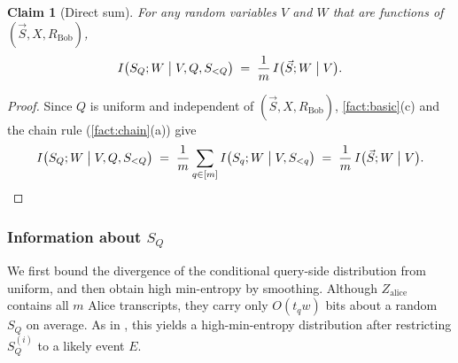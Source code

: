 \documentclass[11pt]{article}
\theoremstyle{plain}
\newtheorem{claim}[theorem]{Claim}
\theoremstyle{definition}
\theoremstyle{remark}
\newcommand{\vS}{\vec{S}}
\begin{document}
\begin{claim}[Direct sum]\label{clm:direct-sum}
For any random variables $V$ and $W$ that are functions of $(\vS, X, R_{\mathrm{Bob}})$,
\[ I\big(S_Q; W \bigm| V, Q, S_{<Q}\big) \;=\; \frac1m\, I\big(\vS; W \bigm| V\big). \]
\end{claim}
\begin{proof}
Since $Q$ is uniform and independent of $(\vS, X, R_{\mathrm{Bob}})$, \cref{fact:basic}(c) and the chain rule (\cref{fact:chain}(a)) give
\[ I\big(S_Q; W \bigm| V, Q, S_{<Q}\big) \;=\; \frac1m \sum_{q \in [m]} I\big(S_q; W \bigm| V, S_{<q}\big) \;=\; \frac1m\, I\big(\vS; W \bigm| V\big). \qedhere \]
\end{proof}

\subsubsection{Information about \texorpdfstring{$S_Q$}{S\_Q}}

We first bound the divergence of the conditional query-side distribution from uniform, and then obtain high min-entropy by smoothing. Although $Z_{\mathrm{alice}}$ contains all $m$ Alice transcripts, they carry only $O(t_qw)$ bits about a random $S_Q$ on average. As in \cite{ko_omega_2026}, this yields a high-min-entropy distribution after restricting $S_Q^{(i)}$ to a likely event $E$.
\end{document}
